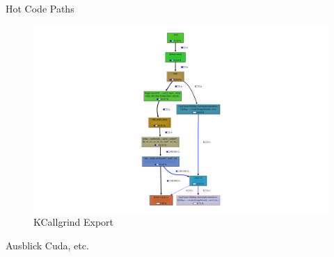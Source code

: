 	\begin{frame}{Hot Code Paths}
		\begin{figure}[ht]
        	\begin{minipage}[b]{0.7\linewidth}
            \centering
            \includegraphics[width=\textwidth]{images/callgrind2.png}
            \caption{KCallgrind Export}
            \label{fig:a}
        	\end{minipage}
	\end{figure}
	\end{frame}

	\begin{frame}{Ausblick}
		Cuda, etc.
	\end{frame}


